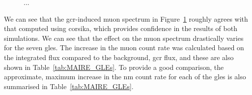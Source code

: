 \begin{figure}[ht!]
	\centering
	\qquad
	\caption{...}
	\label{fig:MAIRE_muon_spectra}
\end{figure}



We can see that the \gls{gcr}-induced muon spectrum in Figure~\ref{fig:MAIRE_muon_spectra} roughly agrees with that computed using \gls{corsika}, which provides confidence in the results of both simulations. We can see that the effect on the muon spectrum drastically varies for the seven \glspl{gle}. The increase in the muon count rate was calculated based on the integrated flux compared to the background, \gls{gcr} flux, and these are also shown in Table~\ref{tab:MAIRE_GLEs}. To provide a good comparison, the approximate, maximum increase in the \gls{nm} count rate for each of the \glspl{gle} is also summarised in Table~\ref{tab:MAIRE_GLEs}. 



